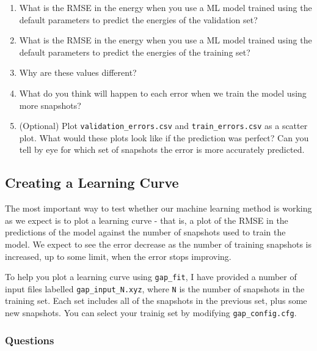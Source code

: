 \documentclass{article}
\begin{document}
\begin{enumerate}
 
\item What is the RMSE in the energy when you use a ML model trained using the default parameters to predict the energies of the validation set?
\item What is the RMSE in the energy when you use a ML model trained using the default parameters to predict the energies of the training set?
\item Why are these values different?
\item What do you think will happen to each error when we train the model using more snapshots?
\item (Optional) Plot \verb|validation_errors.csv| and \verb|train_errors.csv| as a scatter plot. What would these plots look like if the prediction was perfect? Can you tell by eye for which set of snapshots the error is more accurately predicted.

\end{enumerate}

\subsection{Creating a Learning Curve}

The most important way to test whether our machine learning method is working as we expect is to plot a learning curve - that is, a plot of the RMSE in the predictions of the model against the number of snapshots used to train the model. We expect to see the error decrease as the number of training snapshots is increased, up to some limit, when the error stops improving.

To help you plot a learning curve using \verb|gap_fit|, I have provided a number of input files labelled \verb|gap_input_N.xyz|, where \verb|N| is the number of snapshots in the training set. Each set includes all of the snapshots in the previous set, plus some new snapshots. You can select your trainig set by modifying \verb|gap_config.cfg|.

\subsubsection*{Questions}
\end{document}
